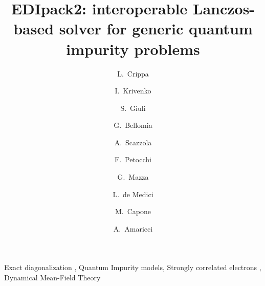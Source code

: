 \documentclass[final,3p,10pt]{elsarticle}
\begin{document}
\begin{frontmatter}

\title{EDIpack2: interoperable Lanczos-based solver for generic quantum impurity problems}
\author[a,b,c]{L.~Crippa}
\author[a]{I.~Krivenko}
\author[d]{S.~Giuli}
\author[d]{G.~Bellomia}
\author[e]{A.~Scazzola}
\author[f]{F.~Petocchi}
\author[g]{G.~Mazza}
\author[h]{L.~de Medici}
\author[d]{M.~Capone}
\author[i]{A.~Amaricci}

\newcommand{\CNRIOM}{CNR-IOM, Istituto Officina dei Materiali,
  Consiglio Nazionale delle Ricerche, Via Bonomea 265, 34136
  Trieste, Italy}
\newcommand{\SISSA}{Scuola Internazionale Superiore di Studi Avanzati (SISSA),
  Via Bonomea 265, 34136 Trieste, Italy}
\newcommand{\ITPHamburg}{I. Institute of Theoretical Physics,
  University of Hamburg, Notkestrasse 9, 22607 Hamburg, Germany}
\newcommand{\WZBURG}{Institut f\"ur Theoretische Physik und
  Astrophysik,Universit\"at W\"urzburg, 97074 W\"urzburg, Germany}
\newcommand{\CTQMAT}{W\"urzburg-Dresden Cluster of Excellence ct.qmat, 01062 Dresden, Germany}
\newcommand{\Geneve}{Department of Quantum Matter Physics, University of
  Geneva, Quai Ernest-Ansermet 24, 1211 Geneva, Switzerland}
\newcommand{\UPISA}{Department of Physics ``E. Fermi'' University of
  Pisa, Largo B. Pontecorvo 3, 56127 Pisa, Italy}
\newcommand{\ESPCI}{LPEM, ESPCI Paris, PSL Research University, CNRS, Sorbonne Universit\'e, 75005 Paris, France}

\address[a]{\ITPHamburg}
\address[b]{\CTQMAT}
\address[c]{\WZBURG}
\address[d]{\SISSA}
\address[e]{Torino}
\address[f]{\Geneve}
\address[g]{\UPISA}
\address[h]{\ESPCI}
\address[i]{\CNRIOM}

\begin{abstract}
  
\end{abstract}

\begin{keyword}
  Exact diagonalization \sep
  Quantum Impurity models\sep  
  Strongly correlated electrons \sep  
  Dynamical Mean-Field Theory
\end{keyword}

\end{frontmatter}
\end{document}
